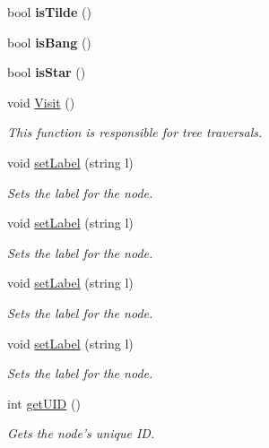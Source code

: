 \begin{DoxyCompactItemize}
\item 
\hypertarget{classAstUnaryOp_a02f2cdfdcf75a4c41cfd2168465c16b0}{bool {\bfseries is\-Tilde} ()}\label{classAstUnaryOp_a02f2cdfdcf75a4c41cfd2168465c16b0}

\item 
\hypertarget{classAstUnaryOp_ab9c6693eaa03da4daf18dc43f01c73d5}{bool {\bfseries is\-Bang} ()}\label{classAstUnaryOp_ab9c6693eaa03da4daf18dc43f01c73d5}

\item 
\hypertarget{classAstUnaryOp_aab9cd20f2a71757480827cb44b7cb0a3}{bool {\bfseries is\-Star} ()}\label{classAstUnaryOp_aab9cd20f2a71757480827cb44b7cb0a3}

\item 
void \hyperlink{classAstUnaryOp_a23e13d42f33d5882d58ca48e8053f1a0}{Visit} ()
\begin{DoxyCompactList}\small\item\em This function is responsible for tree traversals. \end{DoxyCompactList}\item 
void \hyperlink{classAST_a71d680856e95ff89f55d5311a552eba6}{set\-Label} (string l)
\begin{DoxyCompactList}\small\item\em Sets the label for the node. \end{DoxyCompactList}\item 
void \hyperlink{classAST_a71d680856e95ff89f55d5311a552eba6}{set\-Label} (string l)
\begin{DoxyCompactList}\small\item\em Sets the label for the node. \end{DoxyCompactList}\item 
void \hyperlink{classAST_a71d680856e95ff89f55d5311a552eba6}{set\-Label} (string l)
\begin{DoxyCompactList}\small\item\em Sets the label for the node. \end{DoxyCompactList}\item 
void \hyperlink{classAST_a71d680856e95ff89f55d5311a552eba6}{set\-Label} (string l)
\begin{DoxyCompactList}\small\item\em Sets the label for the node. \end{DoxyCompactList}\item 
int \hyperlink{classAST_ab7a5b1d9f1c2de0d98deb356f724a42c}{get\-U\-I\-D} ()
\begin{DoxyCompactList}\small\item\em Gets the node's unique I\-D. \end{DoxyCompactList}\item 

\end{DoxyCompactItemize}
